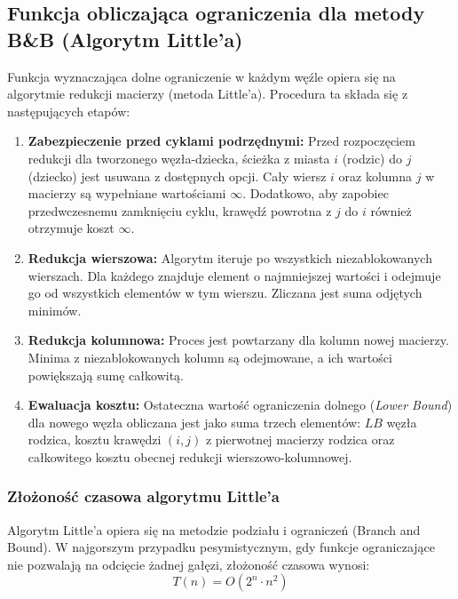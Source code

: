 \documentclass[12pt, a4paper]{article}
\begin{document}
	\subsection{Funkcja obliczająca ograniczenia dla metody B\&B (Algorytm Little'a)}
	Funkcja wyznaczająca dolne ograniczenie w każdym węźle opiera się na algorytmie redukcji macierzy (metoda Little'a). Procedura ta składa się z następujących etapów:
	\begin{enumerate}
		\item \textbf{Zabezpieczenie przed cyklami podrzędnymi:} Przed rozpoczęciem redukcji dla tworzonego węzła-dziecka, ścieżka z miasta $i$ (rodzic) do $j$ (dziecko) jest usuwana z dostępnych opcji. Cały wiersz $i$ oraz kolumna $j$ w macierzy są wypełniane wartościami $\infty$. Dodatkowo, aby zapobiec przedwczesnemu zamknięciu cyklu, krawędź powrotna z $j$ do $i$ również otrzymuje koszt $\infty$.
		\item \textbf{Redukcja wierszowa:} Algorytm iteruje po wszystkich niezablokowanych wierszach. Dla każdego znajduje element o najmniejszej wartości i odejmuje go od wszystkich elementów w tym wierszu. Zliczana jest suma odjętych minimów.
		\item \textbf{Redukcja kolumnowa:} Proces jest powtarzany dla kolumn nowej macierzy. Minima z niezablokowanych kolumn są odejmowane, a ich wartości powiększają sumę całkowitą.
		\item \textbf{Ewaluacja kosztu:} Ostateczna wartość ograniczenia dolnego (\textit{Lower Bound}) dla nowego węzła obliczana jest jako suma trzech elementów: $LB$ węzła rodzica, kosztu krawędzi $(i, j)$ z pierwotnej macierzy rodzica oraz całkowitego kosztu obecnej redukcji wierszowo-kolumnowej.
	\end{enumerate}    

\subsubsection{Złożoność czasowa algorytmu Little'a}
Algorytm Little'a opiera się na metodzie podziału i ograniczeń (Branch and Bound). W najgorszym przypadku pesymistycznym, gdy funkcje ograniczające nie pozwalają na odcięcie żadnej gałęzi, złożoność czasowa wynosi:
\begin{equation}
	T(n) = O(2^n \cdot n^2)
\end{equation}
\end{document}
